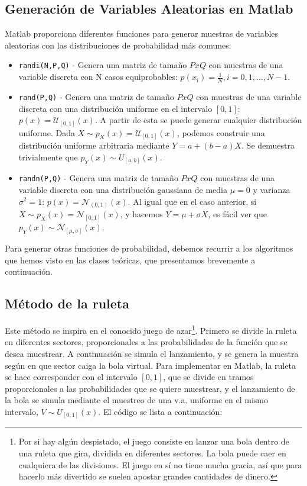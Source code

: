 \documentclass[10pt,twoside,spanish,a4paper]{article}
\begin{document}
\subsection*{Generación de Variables Aleatorias en Matlab}
Matlab proporciona diferentes funciones para generar muestras de variables aleatorias con las distribuciones de probabilidad más comunes: 
\begin{itemize}
	\item \texttt{randi(N,P,Q)} - Genera una matriz de tamaño $PxQ$ con muestras de una variable discreta con N casos equiprobables: $p(x_i)=\frac{1}{N},i=0,1,...,N-1$.
	\item \texttt{rand(P,Q)} - Genera una matriz de tamaño $PxQ$ con muestras de una variable discreta con una distribución uniforme
	en el intervalo $[0,1]$: $p(x)=\mathcal{U}_{[0,1]}(x)$. A partir de esta se puede generar cualquier distribución uniforme. Dada $X\sim p_X(x)=\mathcal{U}_{[0,1]}(x)$,
	podemos construir una distribución uniforme arbitraria mediante $Y=a+(b-a)X$. Se demuestra trivialmente que $p_Y(x)\sim U_{[a,b]}(x)$.
	\item \texttt{randn(P,Q)} - Genera una matriz de tamaño $PxQ$ con muestras de una variable discreta con una distribución gaussiana
	de media $\mu=0$ y varianza $\sigma^2=1$: $p(x)=\mathcal{N}_{(0,1)}(x)$. Al igual que en el caso anterior, si $X\sim p_X(x)=\mathcal{N}_{[0,1]}(x)$,
	y hacemos $Y=\mu+\sigma X$, es fácil ver que $p_Y(x)\sim \mathcal{N}_{[\mu,\sigma]}(x)$.
\end{itemize}

Para generar otras funciones de probabilidad, debemos recurrir a los algoritmos que hemos visto en las clases teóricas, que presentamos 
brevemente a continuación.

\subsection*{Método de la ruleta}
Este método se inspira en el conocido juego de azar\footnote{Por si hay algún despistado, el juego consiste en lanzar una bola dentro de una
ruleta que gira, dividida en diferentes sectores. La bola puede caer en cualquiera de las divisiones. El juego en sí no tiene mucha gracia, así 
que para hacerlo más divertido se suelen apostar grandes cantidades de dinero.}. Primero se divide la ruleta en diferentes sectores, proporcionales
a las probabilidades de la función que se desea muestrear. A continuación se simula el lanzamiento, y se genera la muestra según en que sector
caiga la bola virtual. Para implementar en Matlab, la ruleta se hace corresponder con el intervalo $[0,1]$, que se divide en tramos proporcionales
a las probabilidades que se quiere muestrear, y el lanzamiento de la bola se simula mediante el muestreo de una v.a. uniforme en el mismo
intervalo, $V\sim U_{[0,1]}(x)$. El código se lista a continuación:
\end{document}
